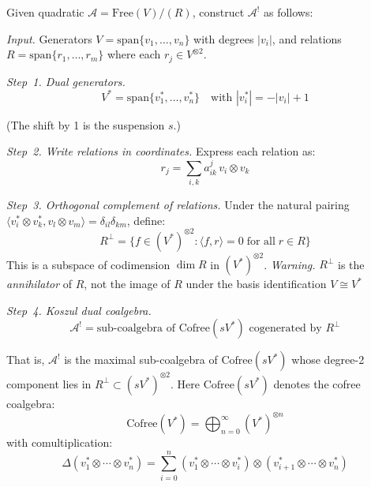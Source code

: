 \begin{construction}\label{const:quadratic-dual-criteria}
Given quadratic $\mathcal{A} = \text{Free}(V) / (R)$, construct $\mathcal{A}^!$ as follows:

\emph{Input.}
Generators $V = \text{span}\{v_1, \ldots, v_n\}$ with degrees $|v_i|$, and relations $R = \text{span}\{r_1, \ldots, r_m\}$ where each $r_j \in V^{\otimes 2}$.

\emph{Step~1. Dual generators.}
\[V^* = \text{span}\{v_1^*, \ldots, v_n^*\} \quad \text{with } |v_i^*| = -|v_i| + 1\]

(The shift by 1 is the suspension $s$.)

\emph{Step~2. Write relations in coordinates.}
Express each relation as:
\[r_j = \sum_{i,k} a_{ik}^j \, v_i \otimes v_k\]

\emph{Step~3. Orthogonal complement of relations.}
Under the natural pairing $\langle v_i^* \otimes v_k^*, v_l \otimes v_m \rangle
= \delta_{il}\delta_{km}$, define:
\[R^\perp = \{f \in (V^*)^{\otimes 2} : \langle f, r \rangle = 0
\;\text{for all}\; r \in R\}\]
This is a subspace of codimension $\dim R$ in $(V^*)^{\otimes 2}$.
\emph{Warning.} $R^\perp$ is the \emph{annihilator} of $R$, not the image of $R$
under the basis identification $V \cong V^*$

\emph{Step~4. Koszul dual coalgebra.}
\[\mathcal{A}^! = \text{sub-coalgebra of } \text{Cofree}(sV^*) \text{ cogenerated by } R^\perp\]

That is, $\mathcal{A}^!$ is the maximal sub-coalgebra of $\text{Cofree}(sV^*)$ whose degree-2 component lies in $R^\perp \subset (sV^*)^{\otimes 2}$.  Here $\text{Cofree}(sV^*)$ denotes the cofree coalgebra:
\[\text{Cofree}(V^*) = \bigoplus_{n=0}^\infty (V^*)^{\otimes n}\]
with comultiplication:
\[\Delta(v_1^* \otimes \cdots \otimes v_n^*) = \sum_{i=0}^n 
(v_1^* \otimes \cdots \otimes v_i^*) \otimes (v_{i+1}^* \otimes \cdots \otimes v_n^*)\]
\end{construction}


